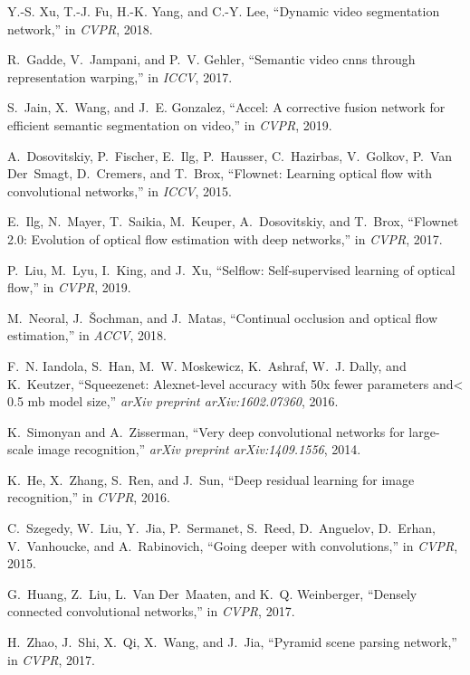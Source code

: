\documentclass[journal]{IEEEtran}
\begin{document}
\begin{thebibliography}{10}
	Y.-S. Xu, T.-J. Fu, H.-K. Yang, and C.-Y. Lee, ``Dynamic video segmentation
	network,'' in \emph{CVPR}, 2018.
	
	R.~Gadde, V.~Jampani, and P.~V. Gehler, ``Semantic video cnns through
	representation warping,'' in \emph{ICCV}, 2017.
	
	S.~Jain, X.~Wang, and J.~E. Gonzalez, ``Accel: A corrective fusion network for
	efficient semantic segmentation on video,'' in \emph{CVPR}, 2019.
	
	A.~Dosovitskiy, P.~Fischer, E.~Ilg, P.~Hausser, C.~Hazirbas, V.~Golkov, P.~Van
	Der~Smagt, D.~Cremers, and T.~Brox, ``Flownet: Learning optical flow with
	convolutional networks,'' in \emph{ICCV}, 2015.
	
	E.~Ilg, N.~Mayer, T.~Saikia, M.~Keuper, A.~Dosovitskiy, and T.~Brox, ``Flownet
	2.0: Evolution of optical flow estimation with deep networks,'' in
	\emph{CVPR}, 2017.
	
	P.~Liu, M.~Lyu, I.~King, and J.~Xu, ``Selflow: Self-supervised learning of
	optical flow,'' in \emph{CVPR}, 2019.
	
	M.~Neoral, J.~{\v{S}}ochman, and J.~Matas, ``Continual occlusion and optical
	flow estimation,'' in \emph{ACCV}, 2018.
	
	F.~N. Iandola, S.~Han, M.~W. Moskewicz, K.~Ashraf, W.~J. Dally, and K.~Keutzer,
	``Squeezenet: Alexnet-level accuracy with 50x fewer parameters and< 0.5 mb
	model size,'' \emph{arXiv preprint arXiv:1602.07360}, 2016.
	
	K.~Simonyan and A.~Zisserman, ``Very deep convolutional networks for
	large-scale image recognition,'' \emph{arXiv preprint arXiv:1409.1556}, 2014.
	
	K.~He, X.~Zhang, S.~Ren, and J.~Sun, ``Deep residual learning for image
	recognition,'' in \emph{CVPR}, 2016.
	
	C.~Szegedy, W.~Liu, Y.~Jia, P.~Sermanet, S.~Reed, D.~Anguelov, D.~Erhan,
	V.~Vanhoucke, and A.~Rabinovich, ``Going deeper with convolutions,'' in
	\emph{CVPR}, 2015.
	
	G.~Huang, Z.~Liu, L.~Van Der~Maaten, and K.~Q. Weinberger, ``Densely connected
	convolutional networks,'' in \emph{CVPR}, 2017.
	
	H.~Zhao, J.~Shi, X.~Qi, X.~Wang, and J.~Jia, ``Pyramid scene parsing network,''
	in \emph{CVPR}, 2017.
	

\end{thebibliography}
\end{document}
